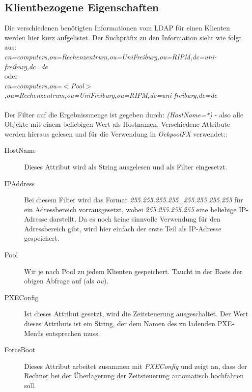 \documentclass[	
				a4paper, 
				twoside,
				11pt,
				DIV11,
				BCOR12mm,
				bibtotoc, 
				halfparskip, 
				headsepline, 
				pointlessnumbers]{scrartcl}
\begin{document}
\subsection{Klientbezogene Eigenschaften}
Die verschiedenen benötigten Informationen vom LDAP für einen Klienten werden hier kurz aufgelistet. Der Suchpräfix zu den Information sieht wie folgt aus: \\ \textit{cn=computers,ou=Rechenzentrum,ou=UniFreiburg,ou=RIPM,dc=uni-freiburg,dc=de} \\
oder \\
\textit{cn=computers,ou=$<$Pool$>$,ou=Rechenzentrum,ou=UniFreiburg,ou=RIPM,dc=uni-freiburg,dc=de} \\ \\
Der Filter auf die Ergebnissmenge ist gegeben durch: \textit{(HostName=*)} - also alle Objekte mit einem beliebigen Wert als Hostnamen. Verschiedene Attribute werden hieraus gelesen und für die Verwendung in \textit{OekpoolFX} verwendet::
\begin{description}
\item[HostName] Dieses Attribut wird als String ausgelesen und als Filter eingesetzt.
\item[IPAddress] Bei diesem Filter wird das Format \textit{255.255.255.255\_255.255.255.255} für ein Adressbereich vorrausgesetzt, wobei \textit{255.255.255.255} eine beliebige IP-Adresse darstellt. Da es noch keine sinnvolle Verwendung für den Adressbereich gibt, wird hier einfach der erste Teil als IP-Adresse gespeichert.
\item[Pool] Wir je nach Pool zu jedem Klienten gespeichert. Taucht in der Basis der obigen Abfrage auf (als \textit{ou}).
\item[PXEConfig] Ist dieses Attribut gesetzt, wird die Zeitsteuerung ausgeschaltet. Der Wert dieses Attributs ist ein String, der dem Namen des zu ladenden PXE-Menüs entsprechen muss.
\item[ForceBoot] Dieses Attribut arbeitet zusammen mit \textit{PXEConfig} und zeigt an, dass der Rechner bei der Überlagerung der Zeitsteuerung automatisch hochfahren soll.
\end{description}
\end{document}
